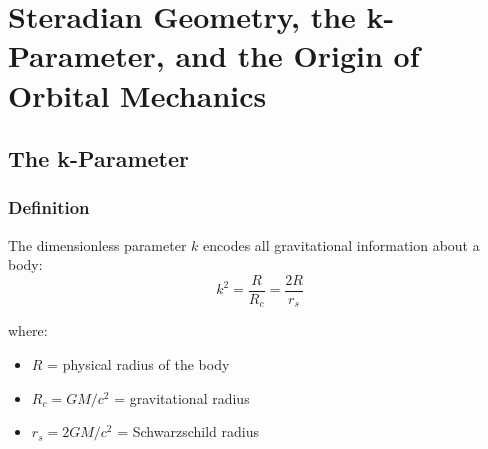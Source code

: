 \chapter{Steradian Geometry, the k-Parameter, and the Origin of Orbital Mechanics}

\author{James Tyndall}
\date{October 2025 -- March 2026}

\begin{abstract}
All orbital mechanics---from electrons to galaxies---derive from a single geometric identity: the solid angle a body subtends times the square of the observation distance equals $\pi R^2$, where $R$ is the body's radius.  This identity, $\Omega(r) \times r^2 = \pi R^2$, is exact to floating-point precision for every planet in the solar system.  From it, we derive the universal orbital velocity law $v = (c/k)\sqrt{R/r}$, the acceleration field $a = c^2 S/r^2$ with $S = R/k^2$, and the $r^{-1/2}$ velocity dependence observed throughout nature---all without invoking gravitational constant $G$, mass $M$, or spacetime curvature.  The dimensionless parameter $k$ encodes a body's gravitational efficiency through the purely geometric ratio $k^2 = R/R_c$, where $R_c$ is the gravitational radius.  For the Sun, $k^2 = \pi(c/v_{\text{rot}})$, linking rotation directly to gravity with 99.96\% accuracy.  This formula fails for planets, revealing that stellar rotation uniquely determines stellar gravity through fusion equilibrium.
\end{abstract}


\section{The k-Parameter}

\subsection{Definition}

The dimensionless parameter $k$ encodes all gravitational information about a body:
\begin{equation}\label{eq:k-def}
  k^2 = \frac{R}{R_c} = \frac{2R}{r_s}
\end{equation}

where:
\begin{itemize}
  \item $R$ = physical radius of the body
  \item $R_c = GM/c^2$ = gravitational radius
  \item $r_s = 2GM/c^2$ = Schwarzschild radius
\end{itemize}

